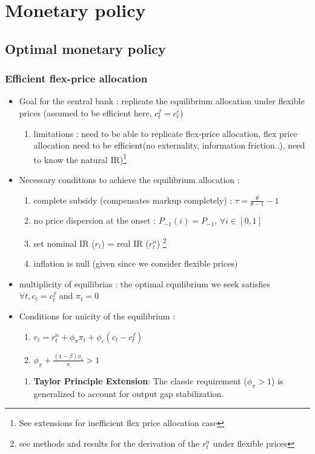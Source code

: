 \documentclass{article}
\begin{document}
\section{Monetary policy}

\subsection{Optimal monetary policy}

\subsubsection{Efficient flex-price allocation}
\begin{itemize}
    \item Goal for the central bank : replicate the equilibrium allocation under flexible prices (assumed to be efficient here, $c_t^f=c_t^e$)
    \begin{enumerate}
        \item limitations : need to be able to replicate flex-price allocation, flex price allocation need to be efficient(no externality, information friction..), need to know the natural IR)\footnote{See extensions for inefficient flex price allocation case}
    \end{enumerate}
    \item Necessary conditions to achieve the equilibrium allocation : 
    \begin{enumerate}
        \item complete subsidy (compensates markup completely) : $\tau = \frac{\theta}{\theta-1}-1$ 
        \item no price dispersion at the onset : $P_{-1}(i)=P_{-1}$, $\forall i\in[0,1]$
        \item set nominal IR ($r_t$) = real IR ($r_t^n$) \footnote{see methods and results for the derivation of the $r_t^n$ under flexible prices}
        \item inflation is null (given since we consider flexible prices)
    \end{enumerate}
    \item multiplicity of equilibrias : the optimal equilibrium we seek satisfies $\forall t, c_t=c_t^f$ and $\pi_t=0$
    \item Conditions for unicity of the equilibrium : 
    \begin{enumerate}
        \item $r_t=r_t^n+\phi_{\pi}\pi_t+\phi_c(c_t-c_t^f)$
        \item $\phi_{\pi}+\frac{(1-\beta)\phi_c}{\kappa} > 1$
    \end{enumerate}
    \begin{intuitionbox}
    \begin{enumerate}
    \item \textbf{Taylor Principle Extension}: The classic requirement ($\phi_{\pi} > 1$) is generalized to account for output gap stabilization.
    

\end{enumerate}
\end{intuitionbox}
\end{itemize}
\end{document}
